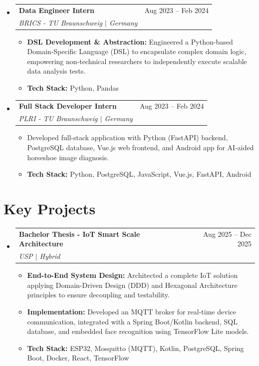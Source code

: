 \documentclass[letterpaper,11pt]{article}
\makeatletter
\newcommand{\resumeItem}[1]{
  \item\small{#1}
}
\newcommand{\resumeSubheading}[4]{
  \vspace{1pt}\item
    \begin{tabular*}{0.97\textwidth}[t]{l@{\extracolsep{\fill}}r}
      \textbf{#1} & #2 \\
      \textit{#3} & \textit{#4} \\
    \end{tabular*}\vspace{-4pt}
}
\makeatother
\begin{document}
\begin{itemize}[leftmargin=0.15in, label={}]
    \resumeSubheading
        {Data Engineer Intern}{Aug 2023 -- Feb 2024}
        {BRICS - TU Braunschweig $|$ Germany}{}
        \begin{itemize}[leftmargin=0.25in, label=\textbullet, itemsep=2pt]
            \resumeItem{\textbf{DSL Development \& Abstraction:} Engineered a Python-based Domain-Specific Language (DSL) to encapsulate complex domain logic, empowering non-technical researchers to independently execute scalable data analysis tests.}
            \resumeItem{\textbf{Tech Stack:} Python, Pandas}
        \end{itemize}

    \resumeSubheading
        {Full Stack Developer Intern}{Aug 2023 -- Feb 2024}
        {PLRI - TU Braunschweig $|$ Germany}{}
        \begin{itemize}[leftmargin=0.25in, label=\textbullet, itemsep=2pt]
            \resumeItem{Developed full-stack application with Python (FastAPI) backend, PostgreSQL database, Vue.js web frontend, and Android app for AI-aided horseshoe image diagnosis.}
            \resumeItem{\textbf{Tech Stack:} Python, PostgreSQL, JavaScript, Vue.js, FastAPI, Android}
        \end{itemize}
\fi
\end{itemize}

\section{Key Projects}
\begin{itemize}[leftmargin=0.15in, label={}]
    \resumeSubheading
        {Bachelor Thesis - IoT Smart Scale Architecture}{Aug 2025 -- Dec 2025}
        {USP $|$ Hybrid}{}
        \begin{itemize}[leftmargin=0.25in, label=\textbullet, itemsep=2pt]
            \resumeItem{\textbf{End-to-End System Design:} Architected a complete IoT solution applying Domain-Driven Design (DDD) and Hexagonal Architecture principles to ensure decoupling and testability.}
            \resumeItem{\textbf{Implementation:} Developed an MQTT broker for real-time device communication, integrated with a Spring Boot/Kotlin backend, SQL database, and embedded face recognition using TensorFlow Lite models.}
            \resumeItem{\textbf{Tech Stack:} ESP32, Mosquitto (MQTT), Kotlin, PostgreSQL, Spring Boot, Docker, React, TensorFlow}
        \end{itemize}
\end{itemize}
\end{document}
